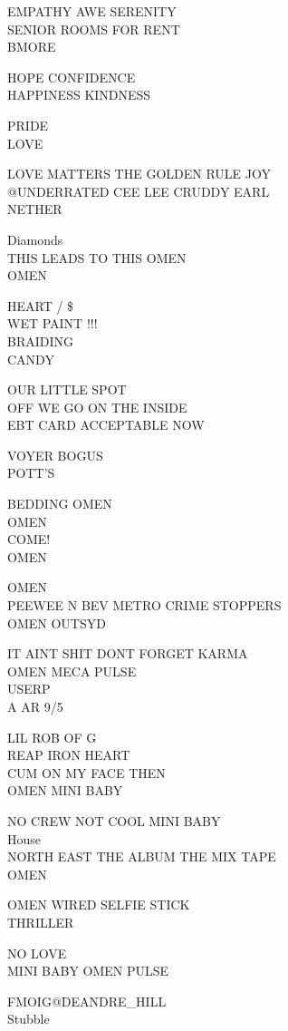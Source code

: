 \documentclass[10pt,letterpaper]{article}
\begin{document}
EMPATHY AWE SERENITY\\
SENIOR ROOMS FOR RENT\\
BMORE

HOPE CONFIDENCE\\
HAPPINESS KINDNESS

PRIDE\\
LOVE

LOVE MATTERS THE GOLDEN RULE JOY\\
@UNDERRATED CEE LEE CRUDDY EARL\\
NETHER

Diamonds\\
THIS LEADS TO THIS OMEN\\
OMEN

HEART / \$\\
WET PAINT !!!\\
BRAIDING\\
CANDY

OUR LITTLE SPOT\\
OFF WE GO ON THE INSIDE\\
EBT CARD ACCEPTABLE NOW

VOYER BOGUS\\
POTT'S

BEDDING OMEN\\
OMEN\\
COME!\\
OMEN

OMEN\\
PEEWEE N BEV METRO CRIME STOPPERS\\
OMEN OUTSYD

IT AINT SHIT DONT FORGET KARMA\\
OMEN MECA PULSE\\
USERP\\
A AR 9/5

LIL ROB OF G\\
REAP IRON HEART\\
CUM ON MY FACE THEN\\
OMEN MINI BABY

NO CREW NOT COOL MINI BABY\\
House\\
NORTH EAST THE ALBUM THE MIX TAPE\\
OMEN

OMEN WIRED SELFIE STICK\\
THRILLER

NO LOVE\\
MINI BABY OMEN PULSE

FMOIG@DEANDRE\_HILL\\
Stubble
\end{document}
